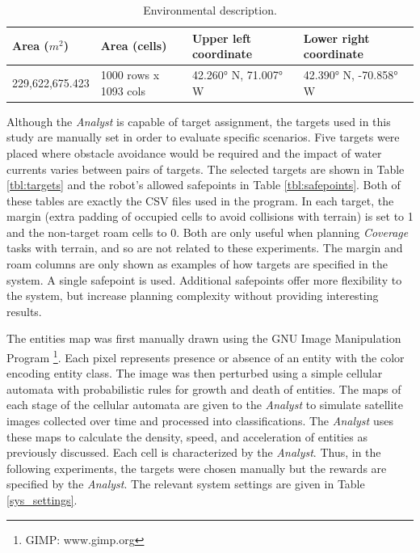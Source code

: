 \documentclass{tamuccthesis}
\begin{document}
\begin{table}[H]\small
    \begin{tabular}{|l|l|l|l|}
\hline
Area ($m^2$) & Area (cells) & Upper left coordinate & Lower right coordinate \\
\hline
229,622,675.423 & 1000 rows x 1093 cols  &  42.260° N, 71.007° W & 42.390° N, -70.858° W \\
\hline
    \end{tabular}
    \caption[Environmental description.]{Environmental description.}
    \label{tbl:env_desc}
\end{table}

Although the \textit{Analyst} is capable of target assignment, the targets used in this study are manually set in order to evaluate specific scenarios. Five targets were placed where obstacle avoidance would be required and the impact of water currents varies between pairs of targets. The selected targets are shown in Table \ref{tbl:targets} and the robot's allowed safepoints in Table \ref{tbl:safepoints}. Both of these tables are exactly the CSV files used in the program. In each target, the margin (extra padding of occupied cells to avoid collisions with terrain) is set to 1 and the non-target roam cells to 0. Both are only useful when planning \textit{Coverage} tasks with terrain, and so are not related to these experiments. The margin and roam columns are only shown as examples of how targets are specified in the system. A single safepoint is used. Additional safepoints offer more flexibility to the system, but increase planning complexity without providing interesting results. 

The entities map was first manually drawn using the GNU Image Manipulation Program \footnote{GIMP: www.gimp.org}. Each pixel represents presence or absence of an entity with the color encoding entity class. The image was then perturbed using a simple cellular automata with probabilistic rules for growth and death of entities. The maps of each stage of the cellular automata are given to the \textit{Analyst} to simulate satellite images collected over time and processed into classifications. The \textit{Analyst} uses these maps to calculate the density, speed, and acceleration of entities as previously discussed. Each cell is characterized by the \textit{Analyst}. Thus, in the following experiments, the targets were chosen manually but the rewards are specified by the \textit{Analyst}. The relevant system settings are given in Table \ref{sys_settings}.
\end{document}
